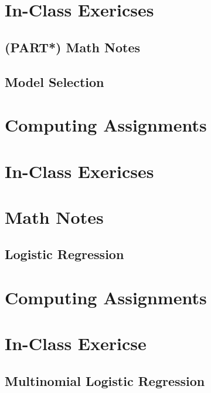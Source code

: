 \documentclass[]{book}
\begin{document}
\part*{In-Class Exericses}\label{part-in-class-exericses}

\chapter{(PART*) Math Notes}\label{part-math-notes}

\chapter{Model Selection}\label{select}

\part*{Computing
Assignments}\label{part-computing-assignments-2}

\part*{In-Class Exericses}\label{part-in-class-exericses-1}

\part*{Math Notes}\label{part-math-notes-1}

\chapter{Logistic Regression}\label{logistic}

\part*{Computing
Assignments}\label{part-computing-assignments-3}

\part*{In-Class Exericse}\label{part-in-class-exericse}

\chapter{Multinomial Logistic Regression}\label{multinom-logistic}
\end{document}
